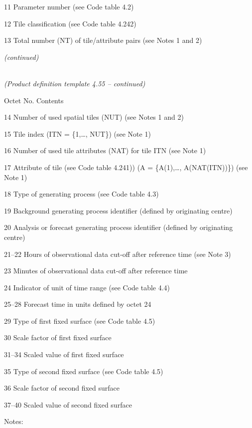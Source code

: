 11 Parameter number (see Code table 4.2)

12 Tile classification (see Code table 4.242)

13 Total number (NT) of tile/attribute pairs (see Notes 1 and 2)

\emph{(continued)}

\emph{\\
(Product definition template 4.55 -- continued)}

Octet No. Contents

14 Number of used spatial tiles (NUT) (see Notes 1 and 2)

15 Tile index (ITN = \{1,\ldots, NUT\}) (see Note 1)

16 Number of used tile attributes (NAT) for tile ITN (see Note 1)

17 Attribute of tile (see Code table 4.241)) (A = \{A(1),\ldots, A(NAT(ITN))\}) (see Note 1)

18 Type of generating process (see Code table 4.3)

19 Background generating process identifier (defined by originating centre)

20 Analysis or forecast generating process identifier (defined by originating centre)

21--22 Hours of observational data cut-off after reference time (see Note 3)

23 Minutes of observational data cut-off after reference time

24 Indicator of unit of time range (see Code table 4.4)

25--28 Forecast time in units defined by octet 24

29 Type of first fixed surface (see Code table 4.5)

30 Scale factor of first fixed surface

31--34 Scaled value of first fixed surface

35 Type of second fixed surface (see Code table 4.5)

36 Scale factor of second fixed surface

37--40 Scaled value of second fixed surface

Notes:

